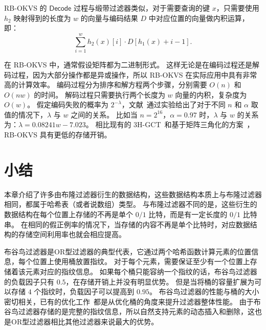 RB-OKVS 的 $\mathsf{Decode}$ 过程与缎带过滤器类似，对于需要查询的键 $x$，只需要使用 $h_2$ 映射得到的长度为 $w$ 的向量与编码结果 $D$ 中对应位置的向量做内积运算，即：
\begin{equation}
  \sum_{i=1}^{w} h_2(x)[i] \cdot D[h_1(x) + i -1].
\end{equation}

在 RB-OKVS 中，通常假设矩阵都为二进制形式。
这样无论是在编码过程还是解码过程，因为大部分操作都是异或操作，所以 RB-OKVS 在实际应用中具有非常高的计算效率。
编码过程分为排序和解方程两个步骤，分别需要 $O(n)$ 和 $O(nw)$ 的时间。
解码过程只需要执行两个长度为 $w$ 向量的内积，复杂度为 $O(w)$。
假定编码失败的概率为 $2^{-\lambda}$，文献~\cite{botelho2013Practical}通过实验给出了对于不同 $n$ 和 $\alpha$ 取值的情况下，$\lambda$ 与 $w$ 之间的关系。
比如当 $n=2^{16}$，$\alpha=0.97$ 时，$\lambda$ 与 $w$ 的关系为：$\lambda = 0.08241 w - 7.023$。
相比现有的 3H-GCT~\cite{garimella2021oblivious}和基于矩阵三角化的方案~\cite{raghuraman2022blazing}，RB-OKVS 具有更低的存储开销。


\section{小结}

本章介绍了许多由布隆过滤器衍生的数据结构，这些数据结构本质上与布隆过滤器相同，都属于哈希表（或者说数组）类型。
与布隆过滤器不同的是，这些衍生的数据结构在每个位置上存储的不再是单个 $0/1$ 比特，而是有一定长度的 $0/1$ 比特串。
在相同的假正例率的情况下，当存储的内容不再是单个比特时，对应数据结构的存储空间利用率也就会相应提高。

布谷鸟过滤器是OR型过滤器的典型代表，它通过两个哈希函数计算元素的位置信息，每个位置上使用桶放置指纹。
对于每个元素，需要保证至少有一个位置上存储着该元素对应的指纹信息。
如果每个桶只能容纳一个指纹的话，布谷鸟过滤器的负载因子只有 $0.5$，在存储开销上并没有明显优势。
但是当将桶的容量扩展为可以存储 $4$ 个指纹时，负载因子可以提高到 $0.95$。
布谷鸟过滤器的性能与桶的大小密切相关，已有的优化工作~\cite{breslow2020morton,wang2019vacuum}都是从优化桶的角度来提升过滤器整体性能。
由于布谷鸟过滤器存储的是完整的指纹信息，所以自然支持元素的动态插入和删除，这也是OR型过滤器相比其他过滤器来说最大的优势。

